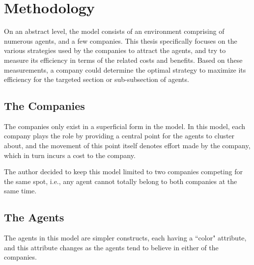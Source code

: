 
\chapter{Methodology} %

\label{Chapter3} %


On an abstract level, the model consists of an environment comprising of numerous agents, and a few companies. This thesis specifically focuses on the various strategies used by the companies to attract the agents, and try to measure its efficiency in terms of the related costs and benefits. Based on these measurements, a company could determine the optimal strategy to maximize its efficiency for the targeted section or sub-subsection of agents.


\section{The Companies}

The companies only exist in a superficial form in the model. In this model, each company plays the role by providing a central point for the agents to cluster about, and the movement of this point itself denotes effort made by the company, which in turn incurs a cost to the company.

The author decided to keep this model limited to two companies competing for the same spot, i.e., any agent cannot totally belong to both companies at the same time. 


\section{The Agents}

The agents in this model are simpler constructs, each  having a ``color" attribute, and this attribute changes as the agents tend to believe in either of the companies.


